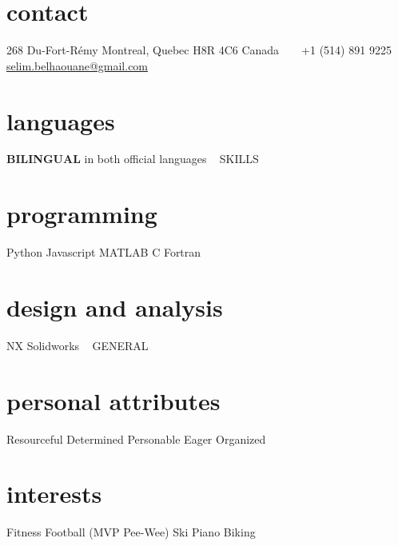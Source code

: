 \documentclass[]{friggeri-cv-mod} %
\newcommand\CC{C\nolinebreak[4]\hspace{-.05em}\raisebox{.4ex}{\relsize{-2}{\textbf{++}}}}
\begin{document}

\begin{aside} %
\section{contact}
268 Du-Fort-Rémy
Montreal, Quebec
H8R 4C6
Canada
~
\Mobilefone ~ +1 (514) 891 9225
\Letter ~ \href{mailto:selim.belhaouane@gmail.com}{selim.belhaouane@gmail.com}
%
\section{languages}
\textbf{BILINGUAL} in both official languages
~
{\LARGE SKILLS}
\section{programming}
Python
Javascript
MATLAB
\CC
Fortran
\section{design and analysis}
NX
Solidworks
%
~
{\LARGE GENERAL}
\section{personal attributes}
Resourceful
Determined
Personable
Eager
Organized
\section{interests}
Fitness
Football (MVP Pee-Wee)
Ski
Piano
Biking
\end{aside}
\end{document}
